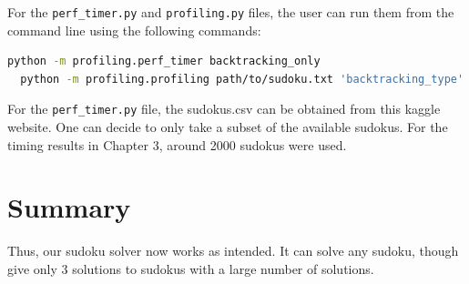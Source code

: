 \documentclass[12pt]{report} %
\begin{document}
For the \texttt{perf\_timer.py} and \texttt{profiling.py} files, the user can run them from the command line using the following commands:

\begin{lstlisting}[language=bash, caption={How to run the profiling and timing files}]
  python -m profiling.perf_timer backtracking_only
  python -m profiling.profiling path/to/sudoku.txt 'backtracking_type' backtracking_only
\end{lstlisting}

For the \texttt{perf\_timer.py} file, the sudokus.csv can be obtained from this kaggle website\cite{kaggle_sudoku_dataset}. One can decide to only take a subset of the available sudokus. For the timing results in Chapter 3, around 2000 sudokus were used.


\chapter{Summary}

Thus, our sudoku solver now works as intended. It can solve any sudoku, though give only 3 solutions to sudokus with a large number of solutions.



\end{document}
